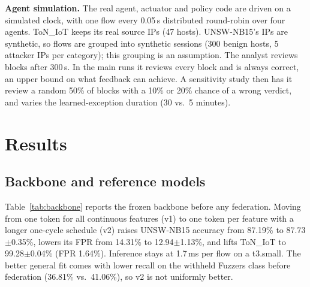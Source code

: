 \documentclass[conference]{IEEEtran}
\begin{document}
\textbf{Agent simulation.} The real agent, actuator and policy code are
driven on a simulated clock, with one flow every 0.05\,s distributed
round-robin over four agents. ToN\_IoT keeps its real source IPs (47 hosts).
UNSW-NB15's IPs are synthetic, so flows are grouped into synthetic sessions
(300 benign hosts, 5 attacker IPs per category); this grouping is an
assumption. The analyst reviews blocks after 300\,s. In the main runs it
reviews every block and is always correct, an upper bound on what feedback can
achieve. A sensitivity study then has it review a random 50\% of blocks with a
10\% or 20\% chance of a wrong verdict, and varies the learned-exception
duration (30 vs.\ 5 minutes).

\section{Results}

\subsection{Backbone and reference models}
Table~\ref{tab:backbone} reports the frozen backbone before any federation.
Moving from one token for all continuous features (v1) to one token per
feature with a longer one-cycle schedule (v2) raises UNSW-NB15 accuracy from
87.19\% to 87.73$\pm$0.35\%, lowers its FPR from 14.31\% to
12.94$\pm$1.13\%, and lifts ToN\_IoT to 99.28$\pm$0.04\% (FPR 1.64\%).
Inference stays at 1.7\,ms per flow on a t3.small. The better general fit
comes with lower recall on the withheld Fuzzers class before federation
(36.81\% vs.\ 41.06\%), so v2 is not uniformly better.

\begin{table}[t]\centering
\caption{Frozen backbone and reference models on the official UNSW-NB15 test set (82{,}332 flows) and the ToN\_IoT held-out split (31{,}656 flows); same eight features, EC2. GBM = gradient-boosted trees. Mean $\pm$ sd over 3 seeds where shown (v1 frozen: single run; federated row: 4 seeds).}
\label{tab:backbone}
\end{table}
\end{document}

